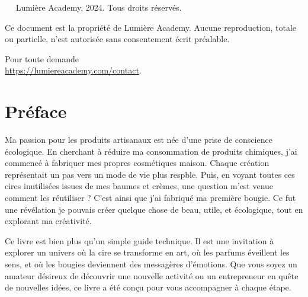 \documentclass[11pt,fleqn,onecolumn,oneside]{book}
\begin{document}
~\vfill
\noindent
\textcopyright\ Lumière Academy, 2024. Tous droits réservés.\par
\noindent
Ce document est la propriété de Lumière Academy. Aucune reproduction, totale ou partielle, n'est autorisée sans consentement écrit préalable.\par
\noindent
Pour toute demande \\ \url{https://lumiereacademy.com/contact}.\par


\pagestyle{empty} %

\renewcommand\contentsname{Table des matières}
\renewcommand{\bibname}{Bibliographie}
\tableofcontents%


\pagestyle{fancy} %


\onecolumn

\newpage
\part*{Préface}

\vspace{0.5cm}

\noindent Ma passion pour les produits artisanaux est née d’une prise de conscience écologique. En cherchant à réduire ma consommation de produits chimiques, j’ai commencé à fabriquer mes propres cosmétiques maison. Chaque création représentait un pas vers un mode de vie plus respble. Puis, en voyant toutes ces cires inutilisées issues de mes baumes et crèmes, une question m’est venue comment les réutiliser ? C’est ainsi que j’ai fabriqué ma première bougie. Ce fut une révélation je pouvais créer quelque chose de beau, utile, et écologique, tout en explorant ma créativité.

\vspace{0.5cm}

\noindent Ce livre est bien plus qu’un simple guide technique. Il est une invitation à explorer un univers où la cire se transforme en art, où les parfums éveillent les sens, et où les bougies deviennent des messagères d’émotions. Que vous soyez un amateur désireux de découvrir une nouvelle activité ou un entrepreneur en quête de nouvelles idées, ce livre a été conçu pour vous accompagner à chaque étape.
\end{document}
